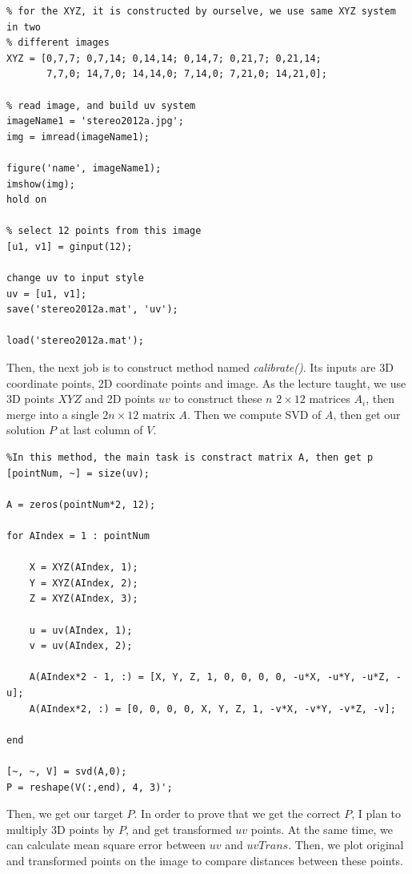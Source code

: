 \documentclass[12pt]{article}
\begin{document}
\begin{lstlisting}
% for the XYZ, it is constructed by ourselve, we use same XYZ system in two
% different images
XYZ = [0,7,7; 0,7,14; 0,14,14; 0,14,7; 0,21,7; 0,21,14;
       7,7,0; 14,7,0; 14,14,0; 7,14,0; 7,21,0; 14,21,0];
       
% read image, and build uv system
imageName1 = 'stereo2012a.jpg';
img = imread(imageName1);

figure('name', imageName1);
imshow(img);
hold on

% select 12 points from this image
[u1, v1] = ginput(12);

change uv to input style
uv = [u1, v1];
save('stereo2012a.mat', 'uv');

load('stereo2012a.mat');
\end{lstlisting}

Then, the next job is to construct method named \textit{calibrate()}. Its inputs are 3D coordinate points, 2D coordinate points and image. As the lecture taught, we use 3D points $XYZ$ and 2D points $uv$ to construct these $n$ $2\times 12$ matrices $A_{i}$, then merge into a single $2n \times 12$ matrix $A$. Then we compute SVD of $A$, then get our solution $P$ at last column of $V$. 

\begin{lstlisting}
%In this method, the main task is constract matrix A, then get p 
[pointNum, ~] = size(uv);
    
A = zeros(pointNum*2, 12);

for AIndex = 1 : pointNum
    
    X = XYZ(AIndex, 1);
    Y = XYZ(AIndex, 2);
    Z = XYZ(AIndex, 3);
        
    u = uv(AIndex, 1);
    v = uv(AIndex, 2);
        
    A(AIndex*2 - 1, :) = [X, Y, Z, 1, 0, 0, 0, 0, -u*X, -u*Y, -u*Z, -u];
    A(AIndex*2, :) = [0, 0, 0, 0, X, Y, Z, 1, -v*X, -v*Y, -v*Z, -v];
        
end
    
[~, ~, V] = svd(A,0);    
P = reshape(V(:,end), 4, 3)';
\end{lstlisting}

Then, we get our target $P$. In order to prove that we get the correct $P$, I plan to multiply 3D points by $P$, and get transformed $uv$ points. At the same time, we can calculate mean square error between $uv$ and $uvTrans$. Then, we plot original and transformed points on the image to compare distances between these points.
\end{document}
